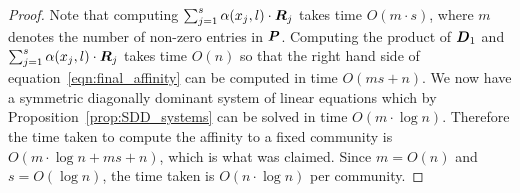 \begin{proof}
Note that computing $\sum_{j = 1}^{s} \alpha (x_j, l) \cdot \boldsymbol{R}_j$ takes time $O(m \cdot s)$, where $m$ 
denotes the number of non-zero entries in $\boldsymbol{P}$. Computing the product of 
$\boldsymbol{D}_1$ and $\sum_{j = 1}^{s} \alpha (x_j, l) \cdot \boldsymbol{R}_j$ takes time $O(n)$ so that 
the right hand side of equation~\ref{eqn:final_affinity} can be computed in time $O(ms + n)$.
We now have a symmetric diagonally dominant system of linear equations which by 
Proposition~\ref{prop:SDD_systems} can be solved in time $O(m \cdot \log n)$. Therefore 
the time taken to compute the affinity to a fixed community is $O(m \cdot \log n + ms + n)$,
which is what was claimed. Since $m = O(n)$ and $s = O(\log n)$, the time taken 
is $O(n \cdot \log n)$ per community.  
%
\end{proof} 
